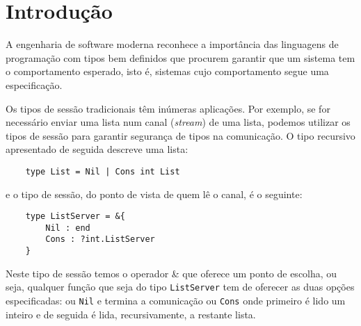 
\section{Introdução}
\label{sec:intro}

A engenharia de software moderna reconhece a importância das linguagens de programação com tipos bem definidos que procurem garantir que um sistema tem o comportamento esperado, isto é, sistemas cujo comportamento segue uma especificação.


Os tipos de sessão tradicionais têm inúmeras aplicações. Por exemplo, se for necessário enviar uma lista num canal (\textit{stream}) de uma lista, podemos utilizar os tipos de sessão para garantir segurança de tipos na comunicação. O tipo recursivo apresentado de seguida descreve uma lista:
\begin{lstlisting}
	type List = Nil | Cons int List
\end{lstlisting}
e o tipo de sessão, do ponto de vista de quem lê o canal, é o seguinte:
\begin{lstlisting}
	type ListServer = &{
		Nil : end
		Cons : ?int.ListServer
	}
\end{lstlisting}

Neste tipo de sessão temos o operador \& que oferece um ponto de escolha, ou seja, qualquer função que seja do tipo \lstinline"ListServer" tem de oferecer as duas opções especificadas: ou \lstinline"Nil" e termina a comunicação ou \lstinline"Cons" onde primeiro é lido um inteiro e de seguida é lida, recursivamente, a restante lista.

